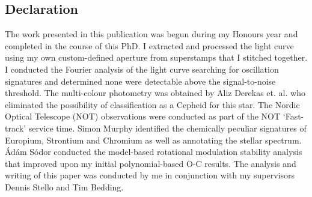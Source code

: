 

\subsection*{Declaration}
The work presented in this publication was begun during my Honours year and completed in the course of this PhD. I extracted and processed the light curve using my own custom-defined aperture from superstamps that I stitched together. I conducted the Fourier analysis of the light curve searching for oscillation signatures and determined none were detectable above the signal-to-noise threshold. The multi-colour photometry was obtained by Aliz Derekas et. al. who eliminated the possibility of classification as a Cepheid for this star. The Nordic Optical Telescope (NOT) observations were conducted as part of the NOT `Fast-track' service time. Simon Murphy identified the chemically peculiar signatures of Europium, Strontium and Chromium as well as annotating the stellar spectrum. \'Ad\'am S\'odor conducted the model-based rotational modulation stability analysis that improved upon my initial polynomial-based O-C results. The analysis and writing of this paper was conducted by me in conjunction with my supervisors Dennis Stello and Tim Bedding.

